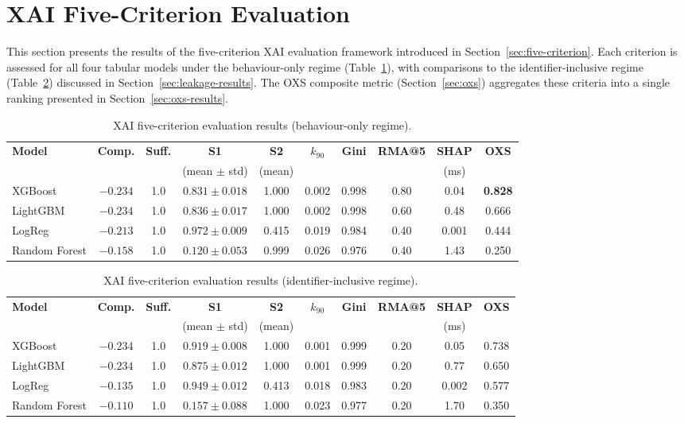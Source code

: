 \documentclass[12pt,a4paper]{report}
\begin{document}
\section{XAI Five-Criterion Evaluation}
\label{sec:xai-results}

This section presents the results of the five-criterion XAI evaluation framework introduced in Section~\ref{sec:five-criterion}. Each criterion is assessed for all four tabular models under the behaviour-only regime (Table~\ref{tab:xai-behav}), with comparisons to the identifier-inclusive regime (Table~\ref{tab:xai-ident}) discussed in Section~\ref{sec:leakage-results}. The OXS composite metric (Section~\ref{sec:oxs}) aggregates these criteria into a single ranking presented in Section~\ref{sec:oxs-results}.

\begin{table}[H]
\centering
\caption{XAI five-criterion evaluation results (behaviour-only regime).}
\label{tab:xai-behav}
\small
\begin{tabular}{lccccccccc}
\toprule
\textbf{Model} & \textbf{Comp.} & \textbf{Suff.} & \textbf{S1} & \textbf{S2} & \textbf{$k_{90}$} & \textbf{Gini} & \textbf{RMA@5} & \textbf{SHAP} & \textbf{OXS} \\
 & & & (mean $\pm$ std) & (mean) & & & & (ms) & \\
\midrule
XGBoost & $-0.234$ & 1.0 & $0.831 \pm 0.018$ & 1.000 & 0.002 & 0.998 & 0.80 & 0.04 & \textbf{0.828} \\
LightGBM & $-0.234$ & 1.0 & $0.836 \pm 0.017$ & 1.000 & 0.002 & 0.998 & 0.60 & 0.48 & 0.666 \\
LogReg & $-0.213$ & 1.0 & $0.972 \pm 0.009$ & 0.415 & 0.019 & 0.984 & 0.40 & 0.001 & 0.444 \\
Random Forest & $-0.158$ & 1.0 & $0.120 \pm 0.053$ & 0.999 & 0.026 & 0.976 & 0.40 & 1.43 & 0.250 \\
\bottomrule
\end{tabular}
\end{table}

\begin{table}[H]
\centering
\caption{XAI five-criterion evaluation results (identifier-inclusive regime).}
\label{tab:xai-ident}
\small
\begin{tabular}{lccccccccc}
\toprule
\textbf{Model} & \textbf{Comp.} & \textbf{Suff.} & \textbf{S1} & \textbf{S2} & \textbf{$k_{90}$} & \textbf{Gini} & \textbf{RMA@5} & \textbf{SHAP} & \textbf{OXS} \\
 & & & (mean $\pm$ std) & (mean) & & & & (ms) & \\
\midrule
XGBoost & $-0.234$ & 1.0 & $0.919 \pm 0.008$ & 1.000 & 0.001 & 0.999 & 0.20 & 0.05 & 0.738 \\
LightGBM & $-0.234$ & 1.0 & $0.875 \pm 0.012$ & 1.000 & 0.001 & 0.999 & 0.20 & 0.77 & 0.650 \\
LogReg & $-0.135$ & 1.0 & $0.949 \pm 0.012$ & 0.413 & 0.018 & 0.983 & 0.20 & 0.002 & 0.577 \\
Random Forest & $-0.110$ & 1.0 & $0.157 \pm 0.088$ & 1.000 & 0.023 & 0.977 & 0.20 & 1.70 & 0.350 \\
\bottomrule
\end{tabular}
\end{table}
\end{document}
